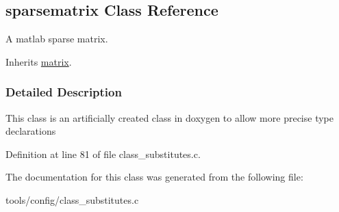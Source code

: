 \hypertarget{classsparsematrix}{}\subsection{sparsematrix Class Reference}
\label{classsparsematrix}


A matlab sparse matrix.  




Inherits \hyperlink{classmatrix}{matrix}.



\subsubsection{Detailed Description}
This class is an artificially created class in doxygen to allow more precise type declarations 

Definition at line 81 of file class\+\_\+substitutes.\+c.



The documentation for this class was generated from the following file\+:\begin{DoxyCompactItemize}
\item 
tools/config/class\+\_\+substitutes.\+c\end{DoxyCompactItemize}
